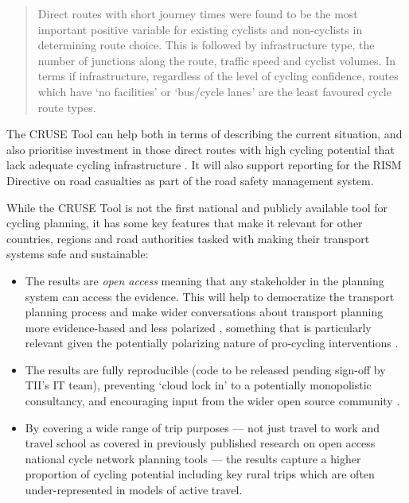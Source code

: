\documentclass[
  super,
  preprint,
  3p]{elsarticle}
\providecommand{\tightlist}{%
  \setlength{\itemsep}{0pt}\setlength{\parskip}{0pt}}\usepackage{longtable,booktabs,array}
\begin{document}
\begin{quote}
Direct routes with short journey times were found to be the most
important positive variable for existing cyclists and non-cyclists in
determining route choice. This is followed by infrastructure type, the
number of junctions along the route, traffic speed and cyclist volumes.
In terms if infrastructure, regardless of the level of cycling
confidence, routes which have `no facilities' or `bus/cycle lanes' are
the least favoured cycle route types.
\end{quote}

The CRUSE Tool can help both in terms of describing the current
situation, and also prioritise investment in those direct routes with
high cycling potential that lack adequate cycling infrastructure
\citep{caulfield2012}. It will also support reporting for the RISM
Directive on road casualties as part of the road safety management
system.

While the CRUSE Tool is not the first national and publicly available
tool for cycling planning, it has some key features that make it
relevant for other countries, regions and road authorities tasked with
making their transport systems safe and sustainable:

\begin{itemize}
\tightlist
\item
  The results are \emph{open access} meaning that any stakeholder in the
  planning system can access the evidence. This will help to democratize
  the transport planning process and make wider conversations about
  transport planning more evidence-based and less polarized
  \citep{lovelace2020}, something that is particularly relevant given
  the potentially polarizing nature of pro-cycling interventions
  \citep{wild2017}.
\item
  The results are fully reproducible (code to be released pending
  sign-off by TII's IT team), preventing `cloud lock in' to a
  potentially monopolistic consultancy, and encouraging input from the
  wider open source community \citep{lovelace2021, dhir2017}.
\item
  By covering a wide range of trip purposes --- not just travel to work
  \citep{lovelace2017, heinen2010} and travel school \citep{goodman2019}
  as covered in previously published research on open access national
  cycle network planning tools --- the results capture a higher
  proportion of cycling potential including key rural trips which are
  often under-represented in models of active travel.
\end{itemize}
\end{document}
